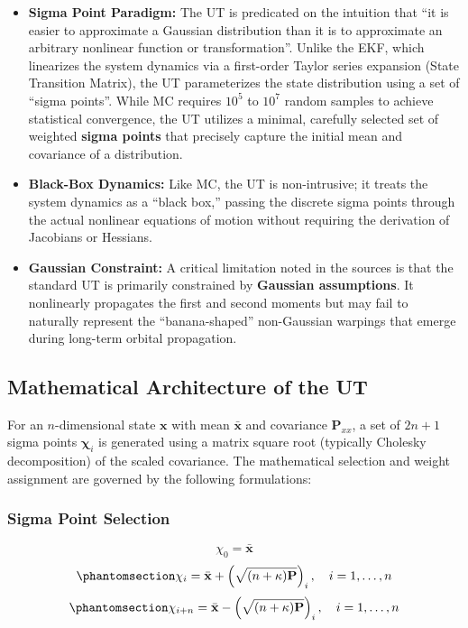 \documentclass[
  letterpaper,
  DIV=11,
  numbers=noendperiod,
  oneside]{scrartcl}
\begin{document}
\begin{itemize}
\item
  \textbf{Sigma Point Paradigm:} The UT is predicated on the intuition
  that ``it is easier to approximate a Gaussian distribution than it is
  to approximate an arbitrary nonlinear function or transformation''.
  Unlike the EKF, which linearizes the system dynamics via a first-order
  Taylor series expansion (State Transition Matrix), the UT
  parameterizes the state distribution using a set of ``sigma points''.
  While MC requires \(10^5\) to \(10^7\) random samples to achieve
  statistical convergence, the UT utilizes a minimal, carefully selected
  set of weighted \textbf{sigma points} that precisely capture the
  initial mean and covariance of a distribution.
\item
  \textbf{Black-Box Dynamics:} Like MC, the UT is non-intrusive; it
  treats the system dynamics as a ``black box,'' passing the discrete
  sigma points through the actual nonlinear equations of motion without
  requiring the derivation of Jacobians or Hessians.
\item
  \textbf{Gaussian Constraint:} A critical limitation noted in the
  sources is that the standard UT is primarily constrained by
  \textbf{Gaussian assumptions}. It nonlinearly propagates the first and
  second moments but may fail to naturally represent the
  ``banana-shaped'' non-Gaussian warpings that emerge during long-term
  orbital propagation.
\end{itemize}

\subsection{Mathematical Architecture of the
UT}\label{mathematical-architecture-of-the-ut}

For an \(n\)-dimensional state \(\mathbf{x}\) with mean
\(\bar{\mathbf{x}}\) and covariance \(\mathbf{P}_{xx}\), a set of
\(2n+1\) sigma points \(\boldsymbol{\chi}_i\) is generated using a
matrix square root (typically Cholesky decomposition) of the scaled
covariance. The mathematical selection and weight assignment are
governed by the following formulations:

\subsubsection{Sigma Point Selection}\label{sigma-point-selection}

\[\chi_0 = \bar{\mathbf{x}}\]
\begin{equation}\protect\phantomsection\label{eq-sigma-points-i}{
\chi_i = \bar{\mathbf{x}} + \left( \sqrt{(n + \kappa) \mathbf{P}} \right)_i, \quad i = 1, \dots, n
}\end{equation}
\begin{equation}\protect\phantomsection\label{eq-sigma-points-in}{
\chi_{i+n} = \bar{\mathbf{x}} - \left( \sqrt{(n + \kappa) \mathbf{P}} \right)_i, \quad i = 1, \dots, n
}\end{equation}
\end{document}
